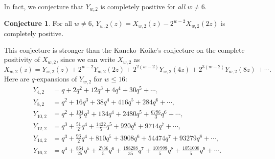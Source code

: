 \documentclass[10pt,reqno]{amsproc}
\newcommand{\1}{\mathds{1}}	%
\theoremstyle{definition}
\newtheorem{conjecture}[theorem]{Conjecture}
\theoremstyle{remark}
\begin{document}
In fact, we conjecture that $Y_{w, 2}$ is completely positive for \emph{all} $w \ne 6$.

\begin{conjecture}
    \label{conj:Yw2cpos}
    For all $w \ne 6$, $Y_{w, 2}(z) = X_{w, 2}(z) - 2^{w-2} X_{w, 2}(2z)$ is completely positive.
\end{conjecture}

This conjecture is stronger than the Kaneko--Koike's conjecture on the complete positivity of $X_{w, 2}$, since we can write $X_{w, 2}$ as
\[
    X_{w, 2}(z) = Y_{w, 2}(z) + 2^{w-2} Y_{w, 2}(2z) + 2^{2(w-2)} Y_{w, 2}(4z) + 2^{3(w-2)} Y_{w, 2}(8z) + \cdots.
\]
Here are $q$-expansions of $Y_{w, 2}$ for $w \le 16$:
\begin{align*}
    Y_{4, 2} &= q + 2q^2 + 12 q^3 + 4 q^4 + 30 q^5 + \cdots, \\
    Y_{8, 2} &= q^2 + 16 q^3 + 38 q^4 + 416 q^5 + 284 q^6 + \cdots, \\
    Y_{10, 2} &= q^2 + \frac{104}{3} q^3 + 134 q^4 + 2480 q^5 + \frac{6796}{3} q^6 + \cdots, \\
    Y_{12, 2} &= q^3 + \frac{51}{2} q^4 + \frac{1422}{5} q^5 + 920 q^6 + 9714 q^7 + \cdots, \\
    Y_{14, 2} &= q^3 + \frac{93}{2} q^4 + 810 q^5 + 3908 q^6 + 54474 q^7 + 93279 q^8 + \cdots, \\
    Y_{16, 2} &= q^4 + \frac{864}{25} q^5 + \frac{2736}{5} q^6 + \frac{188288}{35} q^7 + \frac{107998}{5} q^8 + \frac{1051008}{5} q^9 + \cdots.
\end{align*}


\end{document}
